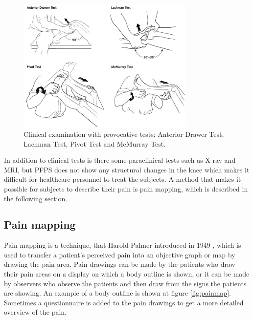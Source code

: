 \begin{figure} [H]
\centering
\includegraphics[width=0.78\textwidth]{figures/kneetest}
\caption{Clinical examination with provocative tests; Anterior Drawer Test, Lachman Test, Pivot Test and McMurray Test.\citep{Ghosh2010}}
\label{fig:kneetest}
\end{figure}

\noindent
In addition to clinical tests is there some paraclinical tests such as X-ray and MRI, but PFPS does not show any structural changes in the knee \citep{Petersen2013} which makes it difficult for healthcare personnel to treat the subjects. A method that makes it possible for subjects to describe their pain is pain mapping, which is described in the following section. 


\subsection{Pain mapping}
Pain mapping is a technique, that Harold Palmer introduced in 1949 \citep{Grunnesjo2006}, which is used to transfer a patient’s perceived pain into an objective graph or map by drawing the pain area. Pain drawings can be made by the patients who draw their pain areas on a display on which a body outline is shown, or it can be made by observers who observe the patients and then draw from the signs the patients are showing. An example of a body outline is shown at figure \ref{fig:painmap}. Sometimes a questionnaire is added to the pain drawings to get a more detailed overview of the pain.\citep{Schott2010}

